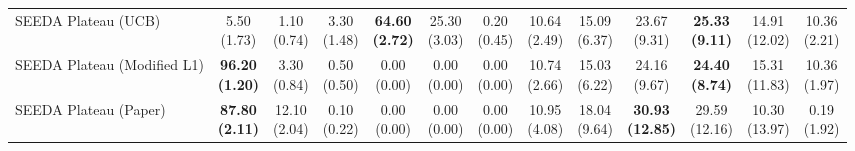 \begin{table}[H]
{\begin{tabular}{l|cccccc|cccccc}
SEEDA Plateau (UCB) & \makecell{5.50 \\ (1.73)} & \makecell{1.10 \\ (0.74)} & {\cellcolor[HTML]{C8E6C9}} \makecell{3.30 \\ (1.48)} & \bfseries \makecell{64.60 \\ (2.72)} & \makecell{25.30 \\ (3.03)} & \makecell{0.20 \\ (0.45)} & \makecell{10.64 \\ (2.49)} & \makecell{15.09 \\ (6.37)} & {\cellcolor[HTML]{C8E6C9}} \makecell{23.67 \\ (9.31)} & \bfseries \makecell{25.33 \\ (9.11)} & \makecell{14.91 \\ (12.02)} & \makecell{10.36 \\ (2.21)} \\
SEEDA Plateau (Modified L1) & \bfseries \makecell{96.20 \\ (1.20)} & \makecell{3.30 \\ (0.84)} & {\cellcolor[HTML]{C8E6C9}} \makecell{0.50 \\ (0.50)} & \makecell{0.00 \\ (0.00)} & \makecell{0.00 \\ (0.00)} & \makecell{0.00 \\ (0.00)} & \makecell{10.74 \\ (2.66)} & \makecell{15.03 \\ (6.22)} & {\cellcolor[HTML]{C8E6C9}} \makecell{24.16 \\ (9.67)} & \bfseries \makecell{24.40 \\ (8.74)} & \makecell{15.31 \\ (11.83)} & \makecell{10.36 \\ (1.97)} \\
SEEDA Plateau (Paper) & \bfseries \makecell{87.80 \\ (2.11)} & \makecell{12.10 \\ (2.04)} & {\cellcolor[HTML]{C8E6C9}} \makecell{0.10 \\ (0.22)} & \makecell{0.00 \\ (0.00)} & \makecell{0.00 \\ (0.00)} & \makecell{0.00 \\ (0.00)} & \makecell{10.95 \\ (4.08)} & \makecell{18.04 \\ (9.64)} & {\cellcolor[HTML]{C8E6C9}} \bfseries \makecell{30.93 \\ (12.85)} & \makecell{29.59 \\ (12.16)} & \makecell{10.30 \\ (13.97)} & \makecell{0.19 \\ (1.92)} \\
\bottomrule
\end{tabular}
}%
\end{table}
